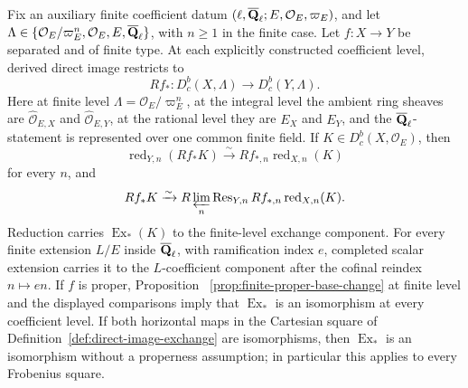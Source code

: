 \begin{proposition}
\label{prop:direct-image-constructibility}


Fix an auxiliary finite coefficient datum
\((\ell,\overline{\mathbf Q}_\ell;E,\mathcal O_E,\varpi_E)\), and let
\(\Lambda\in\{\mathcal O_E/\varpi_E^n,\mathcal O_E,E,\overline{\mathbf Q}_\ell\}\), with
\(n\geq1\) in the finite case.  Let \(f:X\to Y\) be separated and of
finite type.  At each explicitly
constructed coefficient level, derived direct image restricts to
\[
 Rf_*:D^b_c(X,\Lambda)\longrightarrow D^b_c(Y,\Lambda).
\]
Here at finite level
\(\Lambda=\mathcal O_E/\varpi_E^n\), at the integral level the ambient ring
sheaves are \(\widehat{\mathcal O}_{E,X}\) and
\(\widehat{\mathcal O}_{E,Y}\), at the rational level they are \(E_X\) and
\(E_Y\), and the \(\overline{\mathbf Q}_\ell\)-statement is represented over one common finite
field.  If \(K\in D^b_c(X,\mathcal O_E)\), then
\[
 \operatorname{red}_{Y,n}(Rf_*K)
 \xrightarrow{\sim}Rf_{*,n}\operatorname{red}_{X,n}(K)
\]
for every \(n\), and
\[
 Rf_*K\xrightarrow{\sim}
 R\varprojlim_n\operatorname{Res}_{Y,n}
 Rf_{*,n}\operatorname{red}_{X,n}(K).
\]
Reduction carries \(\operatorname{Ex}_*(K)\) to the finite-level exchange
component.  For every finite extension \(L/E\) inside \(\overline{\mathbf Q}_\ell\), with
ramification index \(e\), completed scalar extension carries it to the
\(L\)-coefficient component after the cofinal reindex \(n\mapsto en\).
If \(f\) is proper, Proposition
~\ref{prop:finite-proper-base-change} at finite level and the displayed
comparisons imply that \(\operatorname{Ex}_*\) is an isomorphism at every
coefficient level.
If both horizontal maps in the Cartesian square of
Definition~\ref{def:direct-image-exchange} are isomorphisms, then
\(\operatorname{Ex}_*\) is an isomorphism without a properness assumption;
in particular this applies to every Frobenius square.
\end{proposition}



